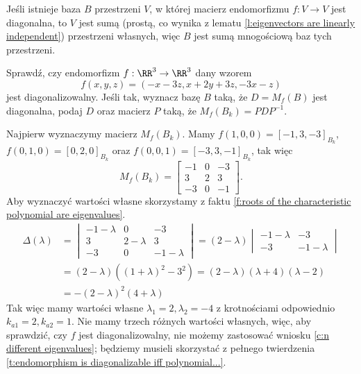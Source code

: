 \begin{remark}
    \label{r:about base of diagonal matrix of endomorphism}
    Jeśli istnieje baza $B$ przestrzeni $V$, w której macierz endomorfizmu $f: V \to V$ jest diagonalna, to $V$ jest sumą (prostą, co wynika z lematu \ref{l:eigenvectors are linearly independent}) przestrzeni własnych, więc $B$ jest sumą mnogościową baz tych przestrzeni.
\end{remark}

\begin{example}
    Sprawdź, czy endomorfizm $f : \RR^3 \to \RR^3$ dany wzorem
    \[ f(x, y, z) = (-x-3z, x + 2y + 3z, -3x - z) \]
    jest diagonalizowalny. Jeśli tak, wyznacz bazę $B$ taką, że $D = M_f(B)$ jest diagonalna, podaj $D$ oraz macierz $P$ taką, że $M_f(B_k) = PDP^{-1}$.
\end{example}
\begin{solution}
    Najpierw wyznaczymy macierz $M_f(B_k)$. Mamy $f(1, 0, 0) = [-1, 3, -3]_{B_k}$, $f(0, 1, 0) = [0, 2, 0]_{B_k}$ oraz $f(0, 0, 1) = [-3, 3, -1]_{B_k}$, tak więc
    \[ M_f(B_k) = \begin{bmatrix}
        -1 & 0 & -3 \\
        3 & 2 & 3 \\
        -3 & 0 & -1
    \end{bmatrix}. \]
    Aby wyznaczyć wartości własne skorzystamy z faktu \ref{f:roots of the characteristic polynomial are eigenvalues}.
    \begin{align*} \Delta(\lambda) &=
        \begin{vmatrix}
            -1 - \lambda & 0 & -3 \\
            3 & 2 - \lambda & 3 \\
            -3 & 0 & -1 - \lambda
        \end{vmatrix} = (2 - \lambda) \begin{vmatrix}
            -1 - \lambda & -3 \\
            -3 & -1 - \lambda
        \end{vmatrix} \\
        &= (2 - \lambda)((1 + \lambda)^2 - 3^2) = (2 - \lambda)(\lambda + 4)(\lambda - 2) \\
        &= -(2 - \lambda)^2(4 + \lambda)
    \end{align*}
    Tak więc mamy wartości własne $\lambda_1 = 2, \lambda_2 = -4$ z krotnościami odpowiednio $k_{a1} = 2, k_{a2} = 1$. Nie mamy trzech różnych wartości własnych, więc, aby sprawdzić, czy $f$ jest diagonalizowalny, nie możemy zastosować wniosku \ref{c:n different eigenvalues}; będziemy musieli skorzystać z pełnego twierdzenia \ref{t:endomorphism is diagonalizable iff polynomial...}.


\end{solution}
